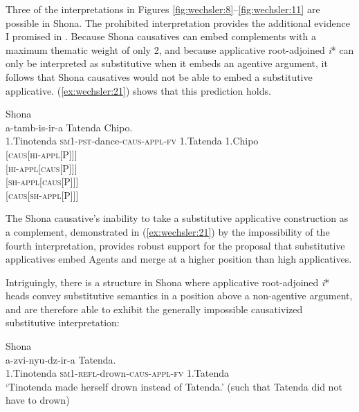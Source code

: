 \documentclass[output=paper,modfonts,nonflat,colorlinks,citecolor=brown]{langsci/langscibook}
\begin{document}
Three of the interpretations in Figures \ref{fig:wechsler:8}--\ref{fig:wechsler:11} are possible in Shona. The prohibited interpretation provides the additional evidence I promised in . Because Shona causatives can embed complements with a maximum thematic weight of only 2, and because applicative root-adjoined \textit{i}* can only be interpreted as substitutive when it embeds an agentive argument, it follows that Shona causatives would not be able to embed a substitutive applicative. (\ref{ex:wechsler:21}) shows that this prediction holds.


\ea\label{ex:wechsler:21}
Shona\\
  {a-tamb-is-ir-a}                                                                      {Tatenda} {Chipo}.\\
1.Tinotenda  \textsc{sm1-pst}{}-dance-\textsc{caus-appl-fv}  1.Tatenda  1.Chipo\\

   \textsc{[caus[hi-appl[{\liv}P]]]}\\
  \textsc{[hi-appl[caus[{\liv}P]]]}\\
  \textsc{[sh-appl[caus[{\liv}P]]]}\\
  {\textsc{[caus[sh-appl[{\liv}P]]]}}\\
\z


The Shona causative’s inability to take a substitutive applicative construction as a complement, demonstrated in (\ref{ex:wechsler:21}) by the impossibility of the fourth interpretation, provides robust support for the proposal that substitutive applicatives embed Agents and merge at a higher position than high applicatives.



Intriguingly, there is a structure in Shona where applicative root-adjoined \textit{i}* heads convey substitutive semantics in a position above a non-agentive argument, and are therefore able to exhibit the generally impossible causativized substitutive interpretation:


\ea\label{ex:wechsler:22}
Shona\\
  {a-zvi-nyu-dz-ir-a} {Tatenda}.\\
1.Tinotenda  \textsc{sm1-refl-}drown\textsc{{}-caus-appl-fv}  1.Tatenda\\
\glt ‘Tinotenda made herself drown instead of Tatenda.'
(such that Tatenda did not have to drown)\\
\z
\end{document}
